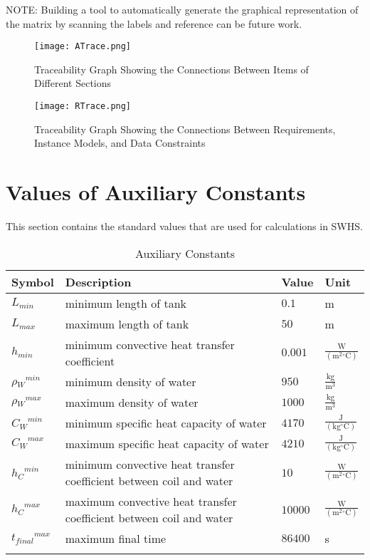 \documentclass[12pt]{article}
\begin{document}
NOTE: Building a tool to automatically generate the graphical representation of the matrix by scanning the labels and reference can be future work.
\begin{figure}
\begin{center}
\texttt{[image: ATrace.png]}
\caption{Traceability Graph Showing the Connections Between Items of Different Sections}
\label{Figure:TraceA}
\end{center}
\end{figure}
\begin{figure}
\begin{center}
\texttt{[image: RTrace.png]}
\caption{Traceability Graph Showing the Connections Between Requirements, Instance Models, and Data Constraints}
\label{Figure:TraceR}
\end{center}
\end{figure}
\section{Values of Auxiliary Constants}
\label{Sec:AuxConstants}
This section contains the standard values that are used for calculations in SWHS.
\begin{longtabu}{l X[l] l l}
\toprule
Symbol & Description & Value & Unit
\\
\midrule
${L_{min}}$ & minimum length of tank & $0.1$ & m
\\
${L_{max}}$ & maximum length of tank & $50$ & m
\\
${h_{min}}$ & minimum convective heat transfer coefficient & $0.001$ & $\frac{\text{W}}{(\text{m}^{2}{}^{\circ}\text{C})}$
\\
${{\rho{}_{W}}^{min}}$ & minimum density of water & $950$ & $\frac{\text{kg}}{\text{m}^{3}}$
\\
${{\rho{}_{W}}^{max}}$ & maximum density of water & $1000$ & $\frac{\text{kg}}{\text{m}^{3}}$
\\
${{C_{W}}^{min}}$ & minimum specific heat capacity of water & $4170$ & $\frac{\text{J}}{(\text{kg}{}^{\circ}\text{C})}$
\\
${{C_{W}}^{max}}$ & maximum specific heat capacity of water & $4210$ & $\frac{\text{J}}{(\text{kg}{}^{\circ}\text{C})}$
\\
${{h_{C}}^{min}}$ & minimum convective heat transfer coefficient between coil and water & $10$ & $\frac{\text{W}}{(\text{m}^{2}{}^{\circ}\text{C})}$
\\
${{h_{C}}^{max}}$ & maximum convective heat transfer coefficient between coil and water & $10000$ & $\frac{\text{W}}{(\text{m}^{2}{}^{\circ}\text{C})}$
\\
${{t_{final}}^{max}}$ & maximum final time & $86400$ & s
\\
\bottomrule
\caption{Auxiliary Constants}
\label{Table:TAuxConsts}
\end{longtabu}
\end{document}
